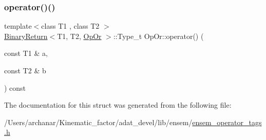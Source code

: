 \mbox{\label{structOpOr_a01b11c55d051ff847a53aab673a65582}} 
\subsubsection{\texorpdfstring{operator()()}{operator()()}\hspace{0.1cm}{\footnotesize\ttfamily [2/2]}}
{\footnotesize\ttfamily template$<$class T1 , class T2 $>$ \\
\mbox{\hyperlink{structBinaryReturn}{Binary\+Return}}$<$T1, T2, \mbox{\hyperlink{structOpOr}{Op\+Or}} $>$\+::Type\+\_\+t Op\+Or\+::operator() (\begin{DoxyParamCaption}\item[{const T1 \&}]{a,  }\item[{const T2 \&}]{b }\end{DoxyParamCaption}) const\hspace{0.3cm}{\ttfamily [inline]}}



The documentation for this struct was generated from the following file\+:\begin{DoxyCompactItemize}
\item 
/\+Users/archanar/\+Kinematic\+\_\+factor/adat\+\_\+devel/lib/ensem/\mbox{\hyperlink{lib_2ensem_2ensem__operator__tags_8h}{ensem\+\_\+operator\+\_\+tags.\+h}}\end{DoxyCompactItemize}
